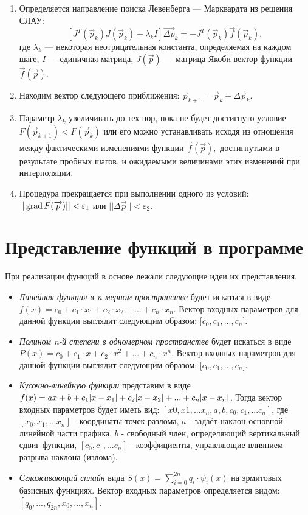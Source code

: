 \begin{enumerate}
	\item Определяется направление поиска Левенберга — Марквардта  из решения СЛАУ: 
	$$[J^{T}({\vec {p}}_{k})J({\vec {p}}_{k})+\lambda _{k}I]{\vec {\Delta p}}_{k}=-J^{T}({\vec {p}}_{k}){\vec {f}}({\vec {p}}_{k}),$$
	где $\lambda _{k}$ — некоторая неотрицательная константа, определяемая на каждом шаге, $I$ — единичная матрица, $J({\vec {p}})$ — матрица Якоби вектор-функции ${\vec {f}}({\vec {p}})$. 
	\item Находим вектор следующего приближения: $\vec {p}_{k+1}={\vec {p}}_{k}+{\Delta \vec {p}}_{k}.$
	\item Параметр $\lambda _{k}$  увеличивать до тех пор, пока не будет достигнуто условие $F({\vec {p}}_{k+1})<F({\vec {p}}_{k})$ или его можно устанавливать исходя из отношения между фактическими изменениями функции ${\vec {f}}({\vec {p}}),$ достигнутыми в результате пробных шагов, и ожидаемыми величинами этих изменений при интерполяции.
	\item Процедура прекращается при выполнении одного из условий: $|| \, \mathrm{grad} \, F(\overrightarrow{p})|| < \varepsilon_1$ или $|| \Delta \overrightarrow{p}|| < \varepsilon_2$.
\end{enumerate}



\section{Представление функций в программе}

При реализации функций в основе лежали следующие идеи их представления.

\begin{itemize}
	\item \textsl{Линейная функция в n-мерном пространстве} будет искаться в виде $f(\overline{x}) = c_0 + c_1 \cdot x_1 + c_2 \cdot x_2 + ... + c_n \cdot x_n$. Вектор входных параметров для данной функции выглядит следующим образом: [$c_0, c_1, ..., c_n$].
	\item \textsl{Полином n-й степени в одномерном пространстве} будет искаться в виде $P(x) = c_0 + c_1 \cdot x + c_2 \cdot x^2 + ... + c_n \cdot x^n$. Вектор входных параметров для данной функции выглядит следующим образом: [$c_0, c_1, ..., c_n$].
	\item \textsl{Кусочно-линейную функции} представим в виде $f(x) = ax + b + c_1 \abs{x - x_1} + c_2 \abs{x - x_2} + ... + c_n \abs{x - x_n}$. Тогда вектор входных параметров будет иметь вид: $[x0, x1, ... x_n, a, b, c_0, c_1, ... c_n]$, где $[x_0, x_1, ... x_n]$ - координаты точек разлома, $a$ - задаёт наклон основной линейной части графика, $b$ - свободный член, определяющий вертикальный сдвиг функции, $[c_0, c_1, ... c_n]$ - коэффициенты, управляющие влиянием разрыва наклона (излома).
	\item \textsl{Сглаживающий сплайн} вида $S(x) = \sum_{i = 0}^{2n} q_i \cdot \psi_i(x)$ на эрмитовых базисных функциях. Вектор входных параметров определяется видом: $[q_0, ..., q_{2n}, x_0, ..., x_n]$.
\end{itemize}